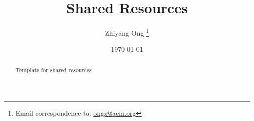 \documentclass[a4paper,10pt]{article}
\begin{document}
\title{Shared Resources}
\date{\today}
\author{Zhiyang Ong
\thanks{Email correspondence to: \href{mailto:ongz@acm.org}{ongz@acm.org}}
}
\maketitle

\begin{abstract} 
{\Huge
Template for shared resources
}

\end{abstract}


\tableofcontents




\end{document}
